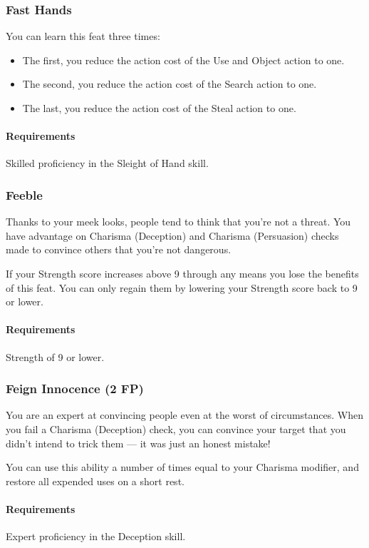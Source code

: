\subsubsection{Fast Hands} \label{feat::fasthands}
    You can learn this feat three times:
    \begin{itemize}
        \item The first, you reduce the action cost of the Use and Object action to one.
        \item The second, you reduce the action cost of the Search action to one.
        \item The last, you reduce the action cost of the Steal action to one.
    \end{itemize}
    \paragraph{Requirements} Skilled proficiency in the Sleight of Hand skill.
\subsubsection{Feeble} \label{feat::feeble}
    Thanks to your meek looks, people tend to think that you're not a threat.
    You have advantage on Charisma (Deception) and Charisma (Persuasion) checks made to convince others that you're not dangerous.

    If your Strength score increases above 9 through any means you lose the benefits of this feat.
    You can only regain them by lowering your Strength score back to 9 or lower.
    \paragraph{Requirements} Strength of 9 or lower.
\subsubsection{Feign Innocence (2 FP)} \label{feat::feigninnocence}
    You are an expert at convincing people even at the worst of circumstances.
    When you fail a Charisma (Deception) check, you can convince your target that you didn't intend to trick them --- it was just an honest mistake!

    You can use this ability a number of times equal to your Charisma modifier, and restore all expended uses on a short rest.
    \paragraph{Requirements} Expert proficiency in the Deception skill.
